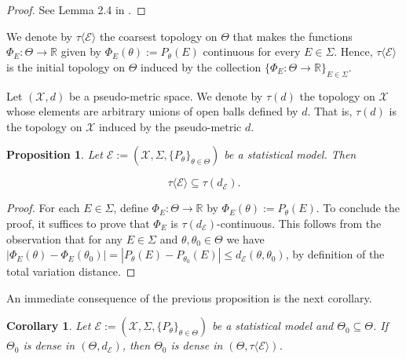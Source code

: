 \documentclass[12pt]{article}
\newtheorem{corollary}{Corollary}[section]
\newtheorem{proposition}{Proposition}[section]
\begin{document}
\begin{proof}
    See Lemma 2.4 in \cite{Strasser1985}.
\end{proof}

We denote by $\tau \langle \mathcal{E}\rangle $ the coarsest topology on $\Theta$ that makes the functions $\Phi _E:\Theta \to \mathbb{R}$ given by $\Phi _E(\theta ):=P_\theta (E)$ continuous for every $E \in \Sigma$. Hence, $\tau \langle \mathcal{E}\rangle $ is the initial topology on $\Theta $ induced by the collection $\{\Phi _E:\Theta \to \mathbb{R}\}_{E\in \Sigma }$.

Let $(\mathcal{X},d)$ be a pseudo-metric space. We denote by $\tau (d)$ the topology on $\mathcal{X}$ whose elements are arbitrary unions of open balls defined by $d$. That is, $\tau (d)$ is the topology on $\mathcal{X}$ induced by the pseudo-metric $d$.

\begin{proposition}
\label{prop:4.4}
Let $\mathcal{E}:=(\mathcal{X},\Sigma,\{P_\theta\}_{\theta\in\Theta})$ be a statistical model. Then 

$$\tau \langle \mathcal{E}\rangle \subseteq \tau (d_\mathcal{E}).$$

\end{proposition}

\begin{proof}
For each $E\in\Sigma$, define $\Phi _E:\Theta\to \mathbb{R}$ by $\Phi _E(\theta):=P_\theta (E)$. To conclude the proof, it suffices to prove that $\Phi _E$ is $\tau (d_\mathcal{E})$-continuous. This follows from the observation that for any $E\in \Sigma$ and $\theta,\theta _0\in \Theta$ we have $|\Phi_E(\theta )-\Phi _E(\theta _0)|=|P_\theta (E)-P_{\theta _0}(E)|\leq d_\mathcal{E}(\theta ,\theta _0)$, by definition of the total variation distance.
\end{proof}

An immediate consequence of the previous proposition is the next corollary.

\begin{corollary}
\label{cor:4.1}
Let $\mathcal{E}:=(\mathcal{X},\Sigma,\{P_\theta\}_{\theta\in\Theta})$ be a statistical model and $\Theta _0\subseteq\Theta $. If $\Theta _0$ is dense in $(\Theta ,d_\mathcal{E})$, then $\Theta _0$ is dense in $(\Theta, \tau \langle \mathcal{E}\rangle )$.
\end{corollary}
\end{document}
